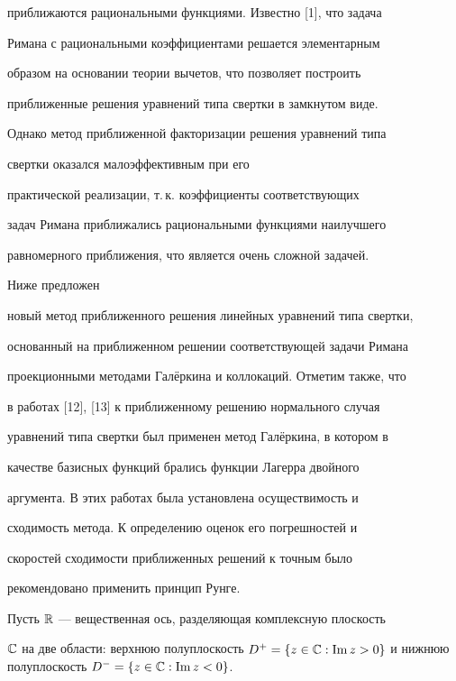 приближаются рациональными функциями. Известно [1], что задача


Римана с рациональными коэффициентами решается элементарным


образом на основании теории вычетов, что позволяет построить


приближенные решения уравнений типа свертки в замкнутом виде.





Однако метод приближенной факторизации решения уравнений типа


свертки оказался малоэффективным при его


практической реализации, т.\,к. коэффициенты соответствующих


задач Римана приближались рациональными функциями наилучшего


равномерного приближения, что является очень сложной задачей.


Ниже предложен


новый метод приближенного решения линейных уравнений типа свертки,


основанный на приближенном решении соответствующей задачи Римана


проекционными методами Гал\"еркина и коллокаций. Отметим также, что


в работах [12], [13] к приближенному решению нормального случая


уравнений типа свертки был применен метод Гал\"еркина, в котором в


качестве базисных функций брались функции Лагерра двойного


аргумента. В этих работах была установлена осуществимость и


сходимость метода. К определению оценок его погрешностей и


скоростей сходимости приближенных решений к точным было


рекомендовано применить принцип Рунге.





Пусть $\Bbb R$ --- вещественная ось, разделяющая комплексную плоскость


$\Bbb{C}$ на две области: верхнюю полуплоскость $D^+=\{z \in


\Bbb{C}: \im z > 0\}$ и нижнюю полуплоскость $D^-=\{z \in


\Bbb{C}: \im z < 0\}$.


\medskip





